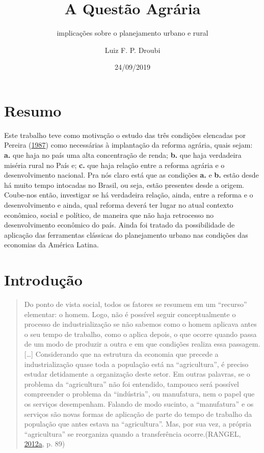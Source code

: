 \documentclass[a4paper, 12pt]{article}
\title{A Questão Agrária}
\subtitle{implicações sobre o planejamento urbano e rural}
\author{Luiz F. P. Droubi}
\date{24/09/2019}
\begin{document}
\maketitle

\hypertarget{resumo}{%
\section*{Resumo}\label{resumo}}

Este trabalho teve como motivação o estudo das três condições elencadas
por Pereira (\protect\hyperlink{ref-questaoagraria}{1987}) como
necessárias à implantação da reforma agrária, quais sejam: \textbf{a.}
que haja no país uma alta concentração de renda; \textbf{b.} que haja
verdadeira miséria rural no País e; \textbf{c.} que haja relação entre a
reforma agrária e o desenvolvimento nacional. Pra nós claro está que as
condições \textbf{a.} e \textbf{b.} estão desde há muito tempo intocadas
no Brasil, ou seja, estão presentes desde a origem. Coube-nos então,
investigar se há verdadeira relação, ainda, entre a reforma e o
desenvolvimento e ainda, qual reforma deverá ter lugar no atual contexto
econômico, social e político, de maneira que não haja retrocesso no
desenvolvimento econômico do país. Ainda foi tratado da possibilidade de
aplicação das ferramentas clássicas do planejamento urbano nas condições
das economias da América Latina.

\hypertarget{introducao}{%
\section{Introdução}\label{introducao}}

\begin{quote}
Do ponto de vista social, todos os fatores se resumem em um ``recurso''
elementar: o homem. Logo, não é possível seguir conceptualmente o
processo de industrialização se não sabemos como o homem aplicava antes
o seu tempo de trabalho, como o aplica depois, o que ocorre quando passa
de um modo de produzir a outra e em que condições realiza essa
passagem.{[}\ldots{}{]} Considerando que na estrutura da economia que
precede a industrialização quase toda a população está na
``agricultura'', é preciso estudar detidamente a organização deste
setor. Em outras palavras, se o problema da ``agricultura'' não foi
entendido, tampouco será possível compreender o problema da
``indústria'', ou manufatura, nem o papel que os serviços desempenham.
Falando de modo sucinto, a ``manufatura'' e os serviços são novas formas
de aplicação de parte do tempo de trabalho da população que antes estava
na ``agricultura''. Mas, por sua vez, a própria ``agricultura'' se
reorganiza quando a transferência ocorre.(RANGEL,
\protect\hyperlink{ref-rangel1954}{2012}\protect\hyperlink{ref-rangel1954}{a},
p. 89)
\end{quote}
\end{document}
